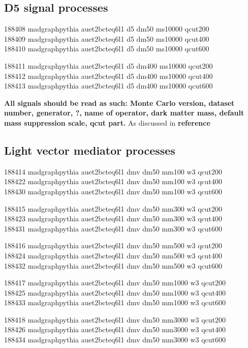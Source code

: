 \subsection{D5 signal processes}
188408 madgraphpythia  auet2bcteq6l1  d5  dm50  ms10000  qcut200\\
188409 madgraphpythia  auet2bcteq6l1  d5  dm50  ms10000  qcut400\\
188410 madgraphpythia  auet2bcteq6l1  d5  dm50  ms10000  qcut600

188411 madgraphpythia  auet2bcteq6l1  d5  dm400  ms10000  qcut200\\
188412 madgraphpythia  auet2bcteq6l1  d5  dm400  ms10000  qcut400\\
188413 madgraphpythia  auet2bcteq6l1  d5  dm400  ms10000  qcut600

\textbf{All signals should be read as such: Monte Carlo version, dataset number, generator, ?, name of operator,  dark matter mass, default mass suppression scale, qcut part.} As discussed in \textbf{reference} 
\subsection{Light vector mediator processes}
188414 madgraphpythia auet2bcteq6l1 dmv dm50 mm100 w3 qcut200\\ 188422 madgraphpythia auet2bcteq6l1 dmv dm50 mm100 w3 qcut400\\
188430 madgraphpythia auet2bcteq6l1 dmv dm50 mm100 w3 qcut600
 
188415 madgraphpythia auet2bcteq6l1 dmv dm50 mm300 w3 qcut200\\
188423 madgraphpythia auet2bcteq6l1 dmv dm50 mm300 w3 qcut400\\
188431 madgraphpythia auet2bcteq6l1 dmv dm50 mm300 w3 qcut600

188416 madgraphpythia auet2bcteq6l1 dmv dm50 mm500 w3 qcut200\\
188424 madgraphpythia auet2bcteq6l1 dmv dm50 mm500 w3 qcut400\\
188432 madgraphpythia auet2bcteq6l1 dmv dm50 mm500 w3 qcut600

188417 madgraphpythia auet2bcteq6l1 dmv dm50 mm1000 w3 qcut200\\
188425 madgraphpythia auet2bcteq6l1 dmv dm50 mm1000 w3 qcut400\\
188433 madgraphpythia auet2bcteq6l1 dmv dm50 mm1000 w3 qcut600

188418 madgraphpythia auet2bcteq6l1 dmv dm50 mm3000 w3 qcut200\\
188426 madgraphpythia auet2bcteq6l1 dmv dm50 mm3000 w3 qcut400\\
188434 madgraphpythia auet2bcteq6l1 dmv dm50 mm3000 w3 qcut600

